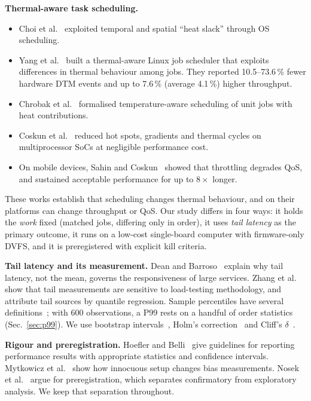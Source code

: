 \documentclass[conference,a4paper]{IEEEtran}
\begin{document}
\textbf{Thermal-aware task scheduling.}
\begin{itemize}
\item Choi et al.~\cite{choi2007} exploited temporal and spatial ``heat slack'' through OS scheduling.
\item Yang et al.~\cite{yang2008} built a thermal-aware Linux job scheduler that exploits differences in thermal
behaviour among jobs. They reported 10.5--73.6\,\% fewer hardware DTM events and up to 7.6\,\% (average 4.1\,\%)
higher throughput.
\item Chrobak et al.~\cite{chrobak2008} formalised temperature-aware scheduling of unit jobs with heat
contributions.
\item Coskun et al.~\cite{coskun2008} reduced hot spots, gradients and thermal cycles on multiprocessor SoCs at
negligible performance cost.
\item On mobile devices, Sahin and Coskun~\cite{sahin2016} showed that throttling degrades QoS, and sustained
acceptable performance for up to $8\times$ longer.
\end{itemize}
These works establish that scheduling changes thermal behaviour, and on their platforms can change throughput or
QoS. Our study differs in four ways: it holds the \emph{work} fixed (matched jobs, differing only in order), it
uses \emph{tail latency} as the primary outcome, it runs on a low-cost single-board computer with firmware-only
DVFS, and it is preregistered with explicit kill criteria.

\textbf{Tail latency and its measurement.} Dean and Barroso~\cite{dean2013} explain why tail latency, not the mean,
governs the responsiveness of large services. Zhang et al.~\cite{zhang2016} show that tail measurements are
sensitive to load-testing methodology, and attribute tail sources by quantile regression. Sample percentiles have
several definitions~\cite{hyndman1996}; with 600 observations, a P99 rests on a handful of order statistics
(Sec.~\ref{sec:p99}). We use bootstrap intervals~\cite{efron1979}, Holm's correction~\cite{holm1979} and Cliff's
$\delta$~\cite{cliff1993}.

\textbf{Rigour and preregistration.} Hoefler and Belli~\cite{hoefler2015} give guidelines for reporting performance
results with appropriate statistics and confidence intervals. Mytkowicz et al.~\cite{mytkowicz2009} show how
innocuous setup changes bias measurements. Nosek et al.~\cite{nosek2018} argue for preregistration, which separates
confirmatory from exploratory analysis. We keep that separation throughout.
\end{document}
